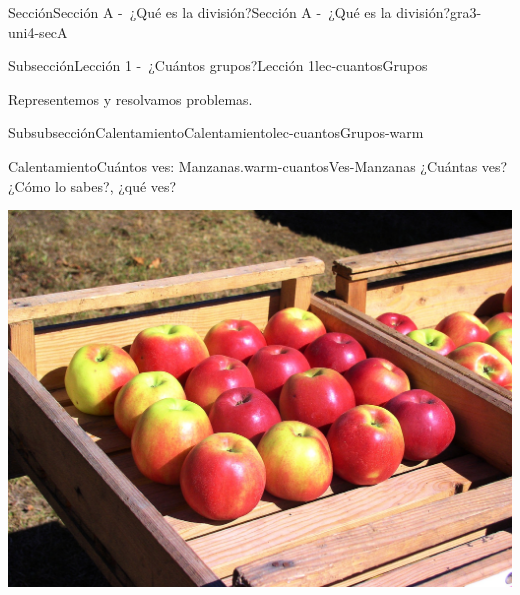 \documentclass[twoside,10pt,]{article}
\begin{document}
\begin{sectionptx}{Sección}{Sección A -~¿Qué es la división?}{}{Sección A -~¿Qué es la división?}{}{}{gra3-uni4-secA}
%
%
\typeout{************************************************}
\typeout{************************************************}
%
\begin{subsectionptx}{Subsección}{Lección 1 -~¿Cuántos grupos?}{}{Lección 1}{}{}{lec-cuantosGrupos}
\begin{introduction}{}%
Representemos y resolvamos problemas.%
\end{introduction}%
%
%
\typeout{************************************************}
\typeout{************************************************}
%
\begin{subsubsectionptx}{Subsubsección}{Calentamiento}{}{Calentamiento}{}{}{lec-cuantosGrupos-warm}
\begin{exploration}{Calentamiento}{Cuántos ves: Manzanas.}{warm-cuantosVes-Manzanas}%
¿Cuántas ves?\\
 ¿Cómo lo sabes?, ¿qué ves?%
\begin{image}{0}{1}{0}{}%
\includegraphics[width=\linewidth]{external/jpg-source/apples-1642732_1920.jpg}
\end{image}%
\end{exploration}%
%
\end{subsubsectionptx}
%
%
\typeout{************************************************}

\end{subsectionptx}
\end{sectionptx}
\end{document}
